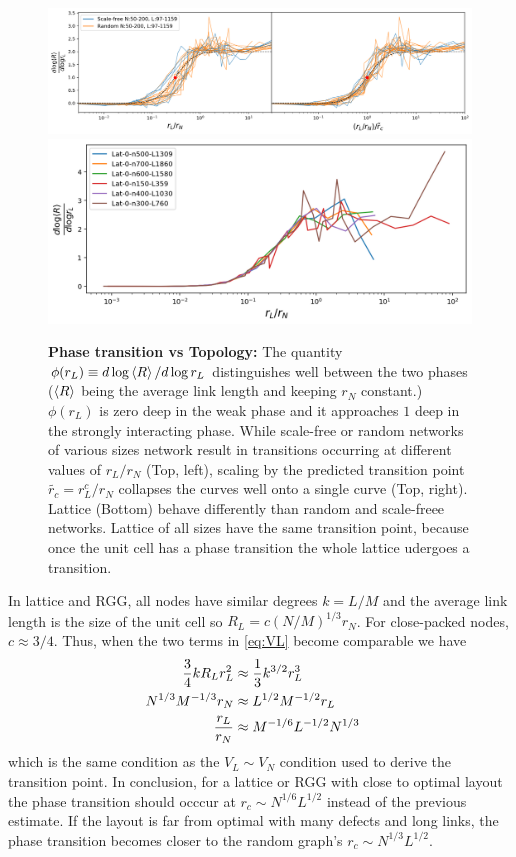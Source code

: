 \documentclass[11pt]{article}
\begin{document}
\begin{figure}
    \centering
    \includegraphics[width=\textwidth]{fig-09-19/phase-collapse-040918.png}
    \includegraphics[width=.6\textwidth]{fig-09-19/phase-lat-040918.png}
    \caption{{\bf Phase transition vs Topology:} The quantity $\phi(r_L)\equiv d\log\left<R\right> /d\log r_L$ distinguishes well between the two phases  ($\left<R\right>$ being the average link length and keeping $r_N$ constant.)
    $\phi (r_L) $ is zero deep in the weak phase and it approaches $1$ deep in the strongly interacting phase. 
    While scale-free or random networks of various sizes network result in transitions occurring at different values of $r_L/r_N$ (Top, left), scaling by the predicted transition point $\tilde{r_c}=r^c_L/r_N$ collapses the curves well onto a single curve (Top, right).
    Lattice (Bottom) behave differently than random and scale-freee networks. 
    Lattice of all sizes have the same transition point, because once the unit cell has a phase transition the whole lattice udergoes a transition. 
    }
    \label{fig:phase-collapse}
\end{figure}


In lattice and RGG, all nodes have similar degrees $k = L/M$ and the average link length is the size of the unit cell so $R_L = c(N/M)^{1/3} r_N$. 
For close-packed nodes, $c \approx 3/4$. 
Thus, when the two terms in \eqref{eq:VL} become comparable we have 
\begin{align}
    {3\over 4} k R_L r_L^2 & \approx {1\over 3} k^{3/2} r_L^3 \cr 
    N^{1/3}M^{-1/3} r_N &\approx L^{1/2} M^{-1/2} r_L \cr
    {r_L \over r_N } &\approx M^{-1/6 } L^{-1/2} N^{1/3}
\end{align}
which is the same condition as the $V_L \sim V_N$ condition used to derive the transition point. 
In conclusion, for a lattice or RGG with close to optimal layout the phase transition should occcur at $r_c \sim N^{1/6} L^{1/2} $ instead of the previous estimate. 
If the layout is far from optimal with many defects and long links, the phase transition becomes closer to the random graph's $r_c \sim N^{1/3} L^{1/2}$. 
\end{document}
